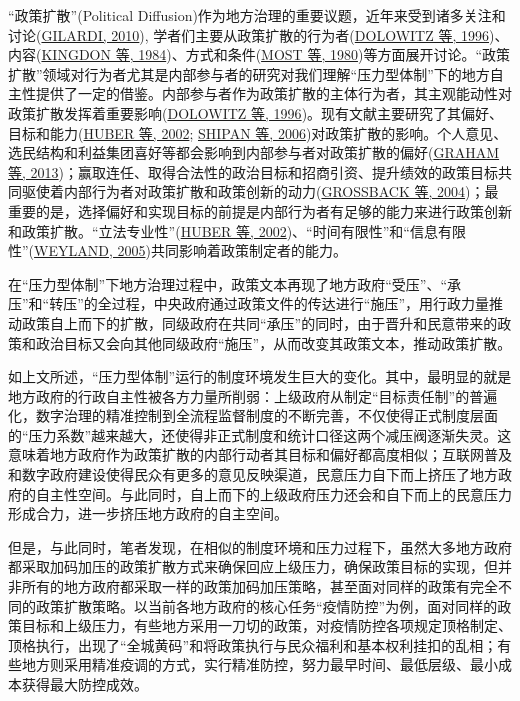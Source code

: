 \documentclass[
  12pt,
]{ctexart}
\begin{document}
``政策扩散''(Political Diffusion)作为地方治理的重要议题，近年来受到诸多关注和讨论(\protect\hyperlink{ref-Gilardi2010}{GILARDI, 2010}), 学者们主要从政策扩散的行为者(\protect\hyperlink{ref-DolowitzMarsh1996}{DOLOWITZ 等, 1996})、内容(\protect\hyperlink{ref-KingdonStano1984}{KINGDON 等, 1984})、方式和条件(\protect\hyperlink{ref-MostStarr1980}{MOST 等, 1980})等方面展开讨论。``政策扩散''领域对行为者尤其是内部参与者的研究对我们理解``压力型体制''下的地方自主性提供了一定的借鉴。内部参与者作为政策扩散的主体行为者，其主观能动性对政策扩散发挥着重要影响(\protect\hyperlink{ref-DolowitzMarsh1996}{DOLOWITZ 等, 1996})。现有文献主要研究了其偏好、目标和能力(\protect\hyperlink{ref-HuberShipan2002}{HUBER 等, 2002}; \protect\hyperlink{ref-ShipanVolden2006a}{SHIPAN 等, 2006})对政策扩散的影响。个人意见、选民结构和利益集团喜好等都会影响到内部参与者对政策扩散的偏好(\protect\hyperlink{ref-GrahamEtAl2013a}{GRAHAM 等, 2013})；赢取连任、取得合法性的政治目标和招商引资、提升绩效的政策目标共同驱使着内部行为者对政策扩散和政策创新的动力(\protect\hyperlink{ref-GrossbackEtAl2004}{GROSSBACK 等, 2004})；最重要的是，选择偏好和实现目标的前提是内部行为者有足够的能力来进行政策创新和政策扩散。``立法专业性''(\protect\hyperlink{ref-HuberShipan2002}{HUBER 等, 2002})、``时间有限性''和``信息有限性''(\protect\hyperlink{ref-Weyland2005}{WEYLAND, 2005})共同影响着政策制定者的能力。

在``压力型体制''下地方治理过程中，政策文本再现了地方政府``受压''、``承压''和``转压''的全过程，中央政府通过政策文件的传达进行``施压''，用行政力量推动政策自上而下的扩散，同级政府在共同``承压''的同时，由于晋升和民意带来的政策和政治目标又会向其他同级政府``施压''，从而改变其政策文本，推动政策扩散。

如上文所述，``压力型体制''运行的制度环境发生巨大的变化。其中，最明显的就是地方政府的行政自主性被各方力量所削弱：上级政府从制定``目标责任制''的普遍化，数字治理的精准控制到全流程监督制度的不断完善，不仅使得正式制度层面的``压力系数''越来越大，还使得非正式制度和统计口径这两个减压阀逐渐失灵。这意味着地方政府作为政策扩散的内部行动者其目标和偏好都高度相似；互联网普及和数字政府建设使得民众有更多的意见反映渠道，民意压力自下而上挤压了地方政府的自主性空间。与此同时，自上而下的上级政府压力还会和自下而上的民意压力形成合力，进一步挤压地方政府的自主空间。

但是，与此同时，笔者发现，在相似的制度环境和压力过程下，虽然大多地方政府都采取加码加压的政策扩散方式来确保回应上级压力，确保政策目标的实现，但并非所有的地方政府都采取一样的政策加码加压策略，甚至面对同样的政策有完全不同的政策扩散策略。以当前各地方政府的核心任务``疫情防控''为例，面对同样的政策目标和上级压力，有些地方采用一刀切的政策，对疫情防控各项规定顶格制定、顶格执行，出现了``全城黄码''和将政策执行与民众福利和基本权利挂扣的乱相；有些地方则采用精准疫调的方式，实行精准防控，努力最早时间、最低层级、最小成本获得最大防控成效。
\end{document}
